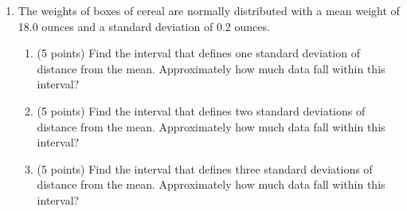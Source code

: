 \documentclass[12pt]{article}
\begin{document}
\begin{enumerate}
\item The weights of boxes of cereal are normally distributed with a mean weight of 18.0 ounces and a standard deviation of 0.2 ounces.
\begin{enumerate}
\item (5 points) Find the interval that defines one standard deviation of distance from the mean.  Approximately how much data fall within this interval?
\vspace{1.2 in}
\item (5 points) Find the interval that defines two standard deviations of distance from the mean.  Approximately how much data fall within this interval?
\vspace{1.2 in}
\item (5 points) Find the interval that defines three standard deviations of distance from the mean.  Approximately how much data fall within this interval?
\vspace{1.2 in}
\end{enumerate}


\end{enumerate}
\end{document}
